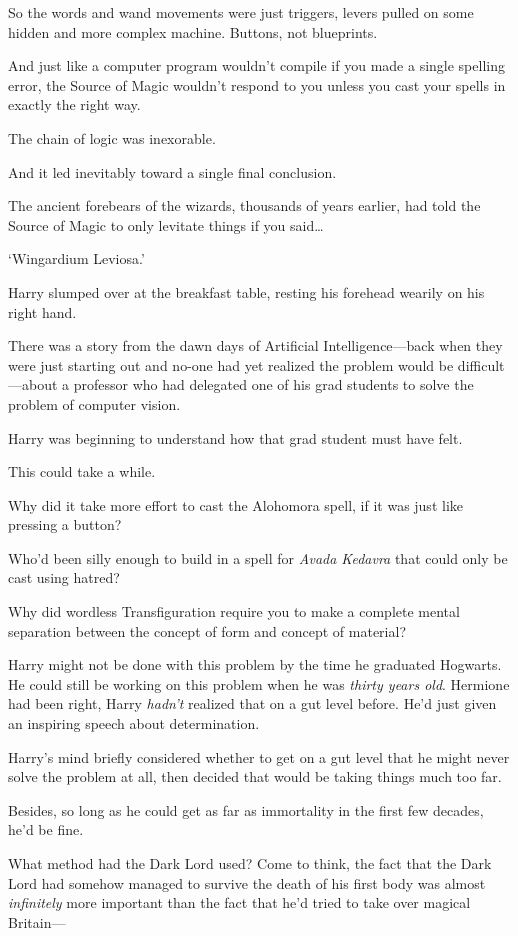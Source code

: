 So the words and wand movements were just triggers, levers pulled on some hidden and more complex machine. Buttons, not blueprints.

And just like a computer program wouldn't compile if you made a single spelling error, the Source of Magic wouldn't respond to you unless you cast your spells in exactly the right way.

The chain of logic was inexorable.

And it led inevitably toward a single final conclusion.

The ancient forebears of the wizards, thousands of years earlier, had told the Source of Magic to only levitate things if you said{\ldots}

`Wingardium Leviosa.'

Harry slumped over at the breakfast table, resting his forehead wearily on his right hand.

There was a story from the dawn days of Artificial Intelligence—back when they were just starting out and no-one had yet realized the problem would be difficult—about a professor who had delegated one of his grad students to solve the problem of computer vision.

Harry was beginning to understand how that grad student must have felt.

This could take a while.

Why did it take more effort to cast the Alohomora spell, if it was just like pressing a button?

Who'd been silly enough to build in a spell for \emph{Avada Kedavra} that could only be cast using hatred?

Why did wordless Transfiguration require you to make a complete mental separation between the concept of form and concept of material?

Harry might not be done with this problem by the time he graduated Hogwarts. He could still be working on this problem when he was \emph{thirty years old}. Hermione had been right, Harry \emph{hadn't} realized that on a gut level before. He'd just given an inspiring speech about determination.

Harry's mind briefly considered whether to get on a gut level that he might never solve the problem at all, then decided that would be taking things much too far.

Besides, so long as he could get as far as immortality in the first few decades, he'd be fine.

What method had the Dark Lord used? Come to think, the fact that the Dark Lord had somehow managed to survive the death of his first body was almost \emph{infinitely} more important than the fact that he'd tried to take over magical Britain—

